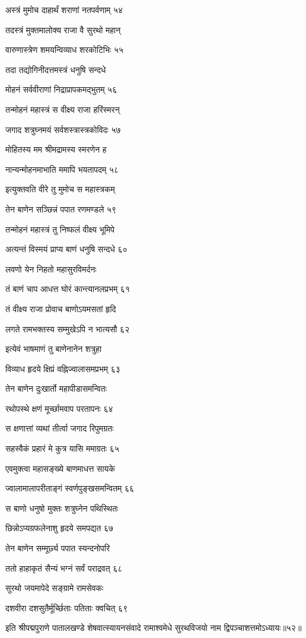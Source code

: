अस्त्रं मुमोच दाहार्थं शराणां नतपर्वणाम् ५४

तदस्त्रं मुक्तमालोक्य राजा वै सुरथो महान्

वारुणास्त्रेण शमयन्विव्याध शरकोटिभिः ५५

तदा तद्योगिनीदत्तमस्त्रं धनुषि सन्दधे

मोहनं सर्ववीराणां निद्राप्रापकमद्भुतम् ५६

तन्मोहनं महास्त्रं स वीक्ष्य राजा हरिंस्मरन्

जगाद शत्रुघ्नमयं सर्वशस्त्रास्त्रकोविदः ५७

मोहितस्य मम श्रीमद्रामस्य स्मरणेन ह

नान्यन्मोहनमाभाति ममापि भयतापदम् ५८

इत्युक्तवति वीरे तु मुमोच स महास्त्रकम्

तेन बाणेन सञ्छिन्नं पपात रणमण्डले ५९

तन्मोहनं महास्त्रं तु निष्फलं वीक्ष्य भूमिपे

अत्यन्तं विस्मयं प्राप्य बाणं धनुषि सन्दधे ६०

लवणो येन निहतो महासुरविमर्दनः

तं बाणं चाप आधत्त घोरं कान्त्यानलप्रभम् ६१

तं वीक्ष्य राजा प्रोवाच बाणोऽयमसतां हृदि

लगते रामभक्तस्य सम्मुखेऽपि न भात्यसौ ६२

इत्येवं भाषमाणं तु बाणेनानेन शत्रुहा

विव्याध हृदये क्षिप्रं वह्निज्वालासमप्रभम् ६३

तेन बाणेन दुःखार्तो महापीडासमन्वितः

रथोपस्थे क्षणं मूर्च्छामवाप परतापनः ६४

स क्षणात्तां व्यथां तीर्त्वा जगाद रिपुमग्रतः

सहस्वैकं प्रहारं मे कुत्र यासि ममाग्रतः ६५

एवमुक्त्वा महासङ्ख्ये बाणमाधत्त सायके

ज्वालामालापरीताङ्गं स्वर्णपुङ्खसमन्वितम् ६६

स बाणो धनुषो मुक्तः शत्रुघ्नेन पथिस्थितः

छिन्नोऽप्यग्रफलेनाशु हृदये समपद्यत ६७

तेन बाणेन सम्मूर्छ्य पपात स्यन्दनोपरि

ततो हाहाकृतं सैन्यं भग्नं सर्वं पराद्रवत् ६८

सुरथो जयमापेदे सङ्ग्रामे रामसेवकः

दशवीरा दशसुतैर्मूर्च्छिताः पतिताः क्वचित् ६९

इति श्रीपद्मपुराणे पातालखण्डे शेषवात्स्यायनसंवादे रामाश्वमेधे सुरथविजयो नाम द्विपञ्चाशत्तमोऽध्यायः॥५२॥

